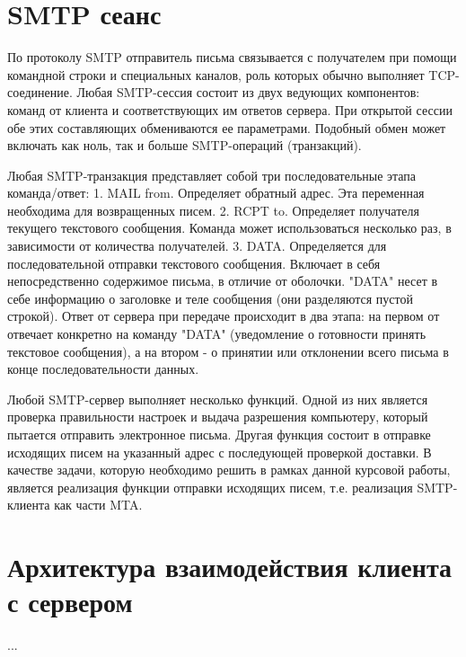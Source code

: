 \documentclass[a4paper,12pt]{report}
\begin{document}
	\section{SMTP сеанс}
	По протоколу SMTP отправитель письма связывается с получателем при помощи командной строки и специальных каналов, роль которых обычно выполняет TCP-соединение. Любая SMTP-сессия состоит из двух ведующих компонентов: команд от клиента и соответствующих им ответов сервера. При открытой сессии обе этих составляющих обмениваются ее параметрами. Подобный обмен может включать как ноль, так и больше SMTP-операций (транзакций).
	
	Любая SMTP-транзакция представляет собой три последовательные этапа команда/ответ:
	1. MAIL from. Определяет обратный адрес. Эта переменная необходима для возвращенных писем.
	2. RCPT to. Определяет получателя текущего текстового сообщения. Команда может использоваться несколько раз, в зависимости от количества получателей.
	3. DATA. Определяется для последовательной отправки текстового сообщения. Включает в себя непосредственно содержимое письма, в отличие от оболочки. "DATA" несет в себе информацию о заголовке и теле сообщения (они разделяются пустой строкой). Ответ от сервера при передаче происходит в два этапа: на первом от отвечает конкретно на команду "DATA" (уведомление о готовности принять текстовое сообщения), а на втором - о принятии или отклонении всего письма в конце последовательности данных.

	Любой SMTP-сервер выполняет несколько функций. Одной из них является проверка правильности настроек и выдача разрешения компьютеру, который пытается отправить электронное письма. Другая функция состоит в отправке исходящих писем на указанный адрес с последующей проверкой доставки. В качестве задачи, которую необходимо решить в рамках данной курсовой работы, является реализация функции отправки исходящих писем, т.е. реализация SMTP-клиента как части MTA.


	\section{Архитектура взаимодействия клиента с сервером}

        ...
\end{document}
